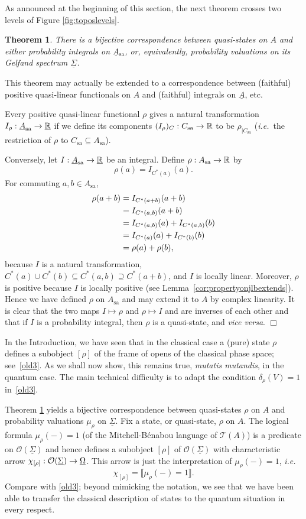 \documentclass[11pt]{article}
\newcommand{\beq}{\begin{equation}}
\newcommand{\eeq}{\end{equation}}
\newcommand{\raw}{\rightarrow} \newcommand{\rat}{\mapsto}
\newcommand{\er}{\eqref}
\newcommand{\dl}{\delta} \newcommand{\Dl}{\Delta}
\newcommand{\rh}{\rho} \newcommand{\sg}{\sigma}
\newcommand{\ch}{\chi} \newcommand{\ps}{\psi} \newcommand{\Ps}{\Psi}
\newcommand{\CO}{{\mathcal O}} \newcommand{\CP}{{\mathcal P}}
\newcommand{\alg}[1]{\ensuremath{#1}}
\newcommand{\functor}[1]{\ensuremath{\underline{#1}}}
\newcommand{\asstopos}{\ensuremath{\mathcal{T}}}
\newcommand{\interpretation}[1]{\ensuremath{\llbracket{#1}\rrbracket}}
\newcommand{\sa}{\ensuremath{_{\mathrm{sa}}}}
\newcommand{\uA}{\underline{A}}
\newcommand{\TA}{\mathcal{T}(A)}
\newcommand{\ie}{\textit{i.e.}}
\newcommand{\ulS}{\functor{\Sigma}}
\renewcommand{\TA}{\asstopos(\alg{A})}
\newtheorem{theorem}{Theorem}
\newenvironment{proof}[1][Proof]%
{ \begin{trivlist}%
  \item[\hskip \labelsep {\bfseries #1}]%
}%
{ \end{trivlist}%
}
\newcommand{\qed}{\nobreak\hfill$\Box$}
\begin{document}
As announced at the beginning of this section,  the next theorem crosses two
levels of Figure \ref{fig:toposlevels}.
\begin{theorem}
\label{thm:statesareintegrals}
  There is a bijective correspondence between quasi-states
  on $\alg{A}$ and either probability integrals on $\functor{\alg{A}}\sa$, or,
  equivalently, probability valuations on its Gelfand spectrum $\ulS$.
\end{theorem}
This theorem may actually be extended to a correspondence between
(faithful) positive quasi-linear functionals on $A$ and (faithful)
integrals on $\functor{\alg{A}}$, etc.
\begin{proof}
  Every positive quasi-linear functional $\rh$ gives a natural transformation
  $I_{\rh}:\uA\sa\raw\underline\R$ if we define its components
   $(I_{\rh})_C:C\sa\raw\R$ to be $\rh_{|C\sa}$ (\ie\ the restriction of $\rh$
to $C\sa\subseteq A\sa$).

Conversely, let $I:\functor{\alg{A}}\sa \raw\underline\R$
   be an integral. Define $\rho:A\sa \to \R$
  by
  \[ \rho(a) = I_{C^*(a)}(a). \]
   For commuting $a,b \in A\sa$,
\begin{align*}
   \rho(a+b)
    & = I_{C^*(a+b)}(a+b)\nonumber \\
    & = I_{C^*(a,b)}(a+b) \nonumber \\
    & =  I_{C^*(a,b)}(a) + I_{C^*(a,b)}(b)\nonumber \\
    & = I_{C^*(a)}(a) + I_{C^*(b)}(b) \nonumber \\
    & = \rho(a) + \rho(b),
\end{align*}
  because $I$ is a natural transformation, $C^*(a) \cup C^*(b)
  \subseteq C^*(a,b) \supseteq C^*(a+b)$, and $I$ is
  locally linear.  Moreover, $\rho$ is
  positive because $I$ is locally positive (see
  Lemma~\ref{cor:propertyonjlbextends}). Hence we have defined $\rh$
  on $A\sa$ and may extend it to $A$ by complex linearity. It is clear
  that the two maps $I\mapsto \rh$ and $\rh\mapsto I$ and are inverses
  of each other and that if $I$ is a probability integral, then $\rh$
  is a quasi-state, and {\it vice versa}.
  \qed
\end{proof}
In the Introduction, we have seen that in the classical case a (pure)
state $\rh$ defines a subobject $[\rho]$ of the frame of opens of the
classical phase space; see~\er{old3}. As we shall now show, this
remains true, {\it mutatis mutandis}, in the quantum case. The main
technical difficulty is to adapt the condition $\dl_{\rho}(V)=1$
in~\er{old3}.

Theorem \ref{thm:statesareintegrals} yields a bijective correspondence
between quasi-states $\rh$ on $A$ and probability valuations $
\mu_{\rh}$ on $\ulS$. Fix a state, or quasi-state, $\rh$ on $A$.  The
logical formula $\mu_{\rho}(-)=1$ (of the Mitchell-B{\'e}nabou
language of $\TA$) is a predicate on $\CO(\ulS)$ and hence defines a
subobject $[\rh]$ of $\CO(\ulS)$ with  characteristic arrow
$\ch_{[\rh]}:\CO(\ulS)\raw\underline{\Om}$. This arrow is just the
interpretation of $\mu_{\rho}(-)=1$, \ie\
\beq
  \ch_{[\rh]}= \interpretation{\mu_{\rho}(-)=1}.\label{rhoint}
\eeq
Compare with \er{old3}; beyond mimicking the notation, we see that we
have been able to transfer the classical description of states to the
quantum situation in every respect.
\end{document}
